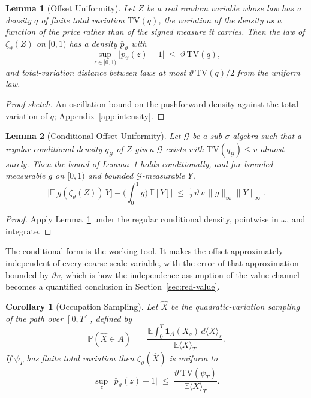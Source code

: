 \documentclass[11pt,a4paper]{article}
\theoremstyle{definition}
\theoremstyle{plain}
\newtheorem{lemma}{Lemma}
\newtheorem{corollary}{Corollary}
\theoremstyle{remark}
\begin{document}
\begin{lemma}[Offset Uniformity]\label{lem:offset}
Let $Z$ be a real random variable whose law has a density $q$ of finite total variation $\mathrm{TV}(q)$, the variation of the density as a function of the price rather than of the signed measure it
carries. Then the law of $\zeta_\vartheta(Z)$ on $[0,1)$ has a density $\bar p_\vartheta$ with
\[
\sup_{z \in [0,1)} \big| \bar p_\vartheta(z) - 1 \big| \;\le\;
\vartheta\, \mathrm{TV}(q),
\]
and total-variation distance between laws at most $\vartheta\,
\mathrm{TV}(q)/2$ from the uniform law.
\end{lemma}

\begin{proof}[Proof sketch]
An oscillation bound on the pushforward density against the total variation of $q$; Appendix~\ref{app:intensity}.
\end{proof}

\begin{lemma}[Conditional Offset Uniformity]\label{lem:conditional}
Let $\mathcal{G}$ be a sub-$\sigma$-algebra such that a regular conditional density $q_{\mathcal{G}}$ of $Z$ given $\mathcal{G}$
exists with $\mathrm{TV}(q_{\mathcal{G}}) \le v$ almost surely. Then the bound of Lemma~\ref{lem:offset} holds conditionally, and for
bounded measurable $g$ on $[0,1)$ and bounded $\mathcal{G}$-measurable $Y$,
\[
\Big| \mathbb{E}\big[ g(\zeta_\vartheta(Z))\, Y \big] -
\Big(\int_0^1 g\Big)\, \mathbb{E}[Y] \Big| \;\le\; \tfrac12\,
\vartheta\, v\, \|g\|_\infty \|Y\|_\infty .
\]
\end{lemma}

\begin{proof}
Apply Lemma~\ref{lem:offset} under the regular conditional density, pointwise in $\omega$, and integrate.
\end{proof}

The conditional form is the working tool. It makes the offset approximately independent of every coarse-scale variable, with the error of that approximation bounded by $\vartheta v$, which is how
the independence assumption of the value channel becomes a quantified conclusion in Section~\ref{sec:red-value}.

\begin{corollary}[Occupation Sampling]\label{cor:occupation}
Let $\hat X$ be the quadratic-variation sampling of the path over
$[0,T]$, defined by
\[
\mathbb{P}(\hat X \in A) \;=\;
\frac{\mathbb{E}\int_0^T \mathbf{1}_A(X_s)\, d\langle X \rangle_s}
{\mathbb{E}\langle X \rangle_T}.
\]
If $\psi_T$ has finite total variation then
$\zeta_\vartheta(\hat X)$ is uniform to
\[
\sup_{z}\, \big|\bar p_\vartheta(z) - 1\big| \;\le\;
\frac{\vartheta\, \mathrm{TV}(\psi_T)}{\mathbb{E}\langle X \rangle_T}.
\]
\end{corollary}
\end{document}
